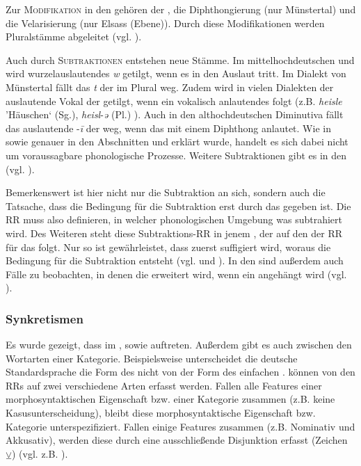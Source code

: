 Zur \textsc{Modifikation} in den  gehören der , die Diphthongierung (nur Münstertal) und die Velarisierung (nur Elsass (Ebene)). Durch diese Modifikationen werden Pluralstämme abgeleitet (vgl. ).

Auch durch \textsc{Subtraktionen} entstehen neue Stämme. Im mittelhochdeutschen  und  wird wurzelauslautendes \textit{w} getilgt, wenn es in den Auslaut tritt. Im Dialekt von Münstertal fällt das \textit{t} der  im Plural weg. Zudem wird in vielen Dialekten der auslautende Vokal der  getilgt, wenn ein vokalisch anlautendes  folgt (z.B. \textit{heisle} ’Häuschen‘ (Sg.), \textit{heisl}-\textit{ə} (Pl.) \citep[98]{Baur1967}). Auch in den althochdeutschen Diminutiva fällt das auslautende -\textit{\=i} der  weg, wenn das  mit einem Diphthong anlautet. Wie in  sowie genauer in den Abschnitten  und  erklärt wurde, handelt es sich dabei nicht um voraussagbare phonologische Prozesse. Weitere Subtraktionen gibt es in den  (vgl. ).

Bemerkenswert ist hier nicht nur die Subtraktion an sich, sondern auch die Tatsache, dass die Bedingung für die Subtraktion erst durch das  gegeben ist. Die RR muss also definieren, in welcher phonologischen Umgebung was subtrahiert wird. Des Weiteren steht diese Subtraktions-RR in jenem , der auf den  der RR für das  folgt. Nur so ist gewährleistet, dass zuerst suffigiert wird, woraus die Bedingung für die Subtraktion entsteht (vgl.  und ). In den  sind außerdem auch Fälle zu beobachten, in denen die  erweitert wird, wenn ein  angehängt wird (vgl. ).

\subsubsection{Synkretismen}\label{5.7.3.3}

Es wurde gezeigt, dass  im ,  sowie  auftreten. Außerdem gibt es auch  zwischen den Wortarten einer Kategorie. Beispielsweise unterscheidet die deutsche Standardsprache die Form des  nicht von der Form des einfachen .  können von den RRs auf zwei verschiedene Arten erfasst werden. Fallen alle Features einer morphosyntaktischen Eigenschaft bzw. einer Kategorie zusammen (z.B. keine Kasusunterscheidung), bleibt diese morphosyntaktische Eigenschaft bzw. Kategorie unterspezifiziert. Fallen einige Features zusammen (z.B. Nominativ und Akkusativ), werden diese durch eine ausschließende Disjunktion erfasst (Zeichen ${\veebar}$) (vgl. z.B. ).

